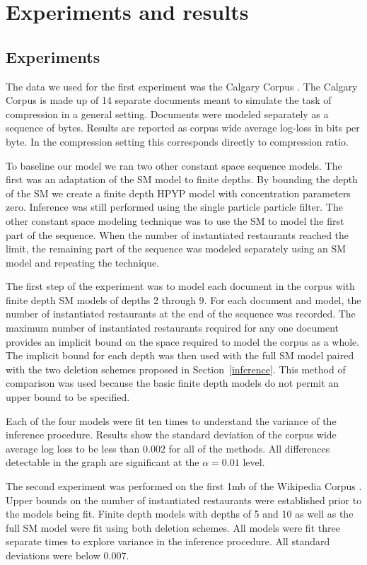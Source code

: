 \section{Experiments and results}
\label{results}

\subsection{Experiments}

The data we used for the first experiment was the Calgary Corpus \cite{calgary corp}.  The Calgary Corpus is made up of 14 separate documents meant to simulate the task of compression in a general setting. Documents were modeled separately as a sequence of bytes.  Results are reported as corpus wide average log-loss in bits per byte.  In the compression setting this corresponds directly to compression ratio.

To baseline our model we ran two other constant space sequence models.  The first was an adaptation of the SM model to finite depths.  By bounding the depth of the SM we create a finite depth HPYP model with concentration parameters zero.  Inference was still performed using the single particle particle filter.  The other constant space modeling technique was to use the SM to model the first part of the sequence.  When the number of instantiated restaurants reached the limit, the remaining part of the sequence was modeled separately using an SM model and repeating the technique.

The first step of the experiment was to model each document in the corpus with finite depth SM models of depths 2 through 9.  For each document and model, the number of instantiated restaurants at the end of the sequence was recorded.  The maximum number of instantiated restaurants required for any one document provides an implicit bound on the space required to model the corpus as a whole.  The implicit bound for each depth was then used with the full SM model paired with the two deletion schemes proposed in Section~\ref{inference}.  This method of comparison was used because the basic finite depth models do not permit an upper bound to be specified.

Each of the four models were fit ten times to understand the variance of the inference procedure.  Results show the standard deviation of the corpus wide average log loss to be less than $0.002$ for all of the methods.  All differences detectable in the graph are significant at the $\alpha = 0.01$ level.

The second experiment was performed on the first 1mb of the Wikipedia Corpus \cite{wikicorp}.  Upper bounds on the number of instantiated restaurants were established prior to the models being fit.  Finite depth models with depths of 5 and 10 as well as the full SM model were fit using both deletion schemes.  All models were fit three separate times to explore variance in the inference procedure.  All standard deviations were below $0.007$.